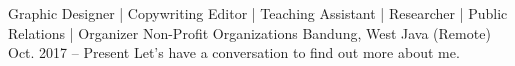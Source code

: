 \begin{cventries}

\cventry
{Graphic Designer | Copywriting Editor | Teaching Assistant | Researcher | Public Relations | Organizer} %
{Non-Profit Organizations} %
{Bandung, West Java (Remote)} %
{Oct. 2017 -- Present} %
{ %
Let's have a conversation to find out more about me.
}






\end{cventries}
